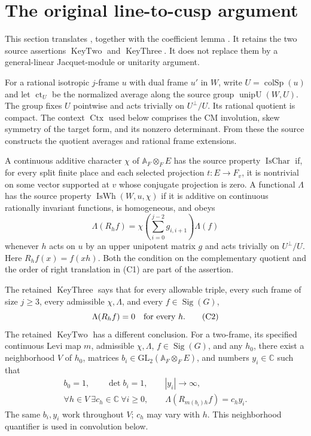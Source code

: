 
\section{The original line-to-cusp argument}
\label{sec:sr-source-line-cusp}

This section translates
,
together with the coefficient lemma .
It retains the two source assertions \(\operatorname{KeyTwo}\)
and \(\operatorname{KeyThree}\). It does not replace them by
a general-linear Jacquet-module or unitarity argument.

For a rational isotropic \(j\)-frame \(u\) with dual frame \(u'\)
in \(W\), write \(U=\operatorname{colSp}(u)\) and let
\(\operatorname{ct}_U\) be the normalized average along the
source group \(\operatorname{unipU}(W,U)\).
The group fixes \(U\) pointwise and acts trivially on \(U^\perp/U\).
Its rational quotient is compact.
The context \(\operatorname{Ctx}\) used below comprises the CM
involution, skew symmetry of the target form, and its nonzero
determinant. From these the source constructs the quotient
averages and rational frame extensions.

A continuous additive character \(\chi\) of \(\mathbb A_F\otimes_F E\)
has the source property \(\operatorname{IsChar}\) if, for every
split finite place and each selected projection
\(t:E\to F_v\), it is nontrivial on some vector supported at \(v\)
whose conjugate projection is zero.
A functional \(\Lambda\) has the source property
\(\operatorname{IsWh}(W,u,\chi)\) if it is additive on continuous
rationally invariant functions, is homogeneous, and obeys
\[
 \Lambda(R_hf)=
       \chi\!\left(\sum_{i=0}^{j-2}g_{i,i+1}\right)\Lambda(f)
 \tag{C1}\label{eq:sr-source-whittaker-law}
\]
whenever \(h\) acts on \(u\) by an upper unipotent matrix \(g\)
and acts trivially on \(U^\perp/U\).
Here \(R_hf(x)=f(xh)\).
Both the condition on the complementary quotient and the order
of right translation in (C1) are part of the assertion.

The retained \(\operatorname{KeyThree}\) says that for every
allowable triple, every such frame of size \(j\ge3\),
every admissible \(\chi,\Lambda\), and every
\(f\in\operatorname{Sig}(G)\),
\[
                         \Lambda(R_hf)=0
                              \quad\hbox{for every }h.
 \tag{C2}\label{eq:sr-source-keyThree}
\]
The retained \(\operatorname{KeyTwo}\) has a different conclusion.
For a two-frame, its specified continuous Levi map \(m\),
admissible \(\chi,\Lambda\), \(f\in\operatorname{Sig}(G)\),
and any \(h_0\), there exist a neighborhood \(V\) of \(h_0\),
matrices \(b_i\in\mathrm{GL}_2(\mathbb A_F\otimes_F E)\),
and numbers \(y_i\in\mathbb C\) such that
\[
 \begin{gathered}
 b_0=1,\qquad \det b_i=1,\qquad |y_i|\longrightarrow\infty,\\
 \forall h\in V\ \exists c_h\in\mathbb C\
       \forall i\ge0,\qquad
      \Lambda(R_{m(b_i)h}f)=c_h y_i .
 \end{gathered}                                    \tag{C3}
 \label{eq:sr-source-keyTwo}
\]
The same \(b_i,y_i\) work throughout \(V\); \(c_h\) may vary with \(h\).
This neighborhood quantifier is used in convolution below.

